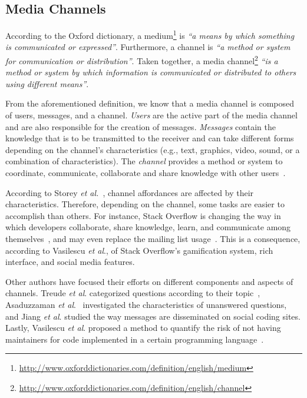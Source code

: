 \documentclass{sig-alternate-05-2015}
\begin{document}
\subsection{Media Channels}

	According to the Oxford dictionary, a medium\footnote{\url{http://www.oxforddictionaries.com/definition/english/medium}} is \textit{``a means by which something is communicated or expressed''}. 
	Furthermore, a channel is \textit{``a method or system for communication or distribution''}.
	Taken together, a media channel\footnote{\url{http://www.oxforddictionaries.com/definition/english/channel}} \textit{``is a method or system by which information is communicated or distributed to others using different means''}.

	From the aforementioned definition, we know that a media channel is composed of users, messages, and a channel. 
	\textit{Users} are the active part of the media channel and are also responsible for the creation of messages. 
	\textit{Messages} contain the knowledge that is to be transmitted to the receiver and can take different forms depending on the channel's characteristics (e.g., text, graphics, video, sound, or a combination of characteristics).
	The \textit{channel} provides a method or system to coordinate, communicate, collaborate and share knowledge with other users~\cite{Storey2014}.

	According to Storey \textit{et al.}~\cite{Storey2014}, channel affordances are affected by their characteristics.
	Therefore, depending on the channel, some tasks are easier to accomplish than others.
	For instance, Stack Overflow is changing the way in which developers collaborate, share knowledge, learn, and communicate among themselves~\cite{Storey2014}, and may even replace the mailing list usage~\cite{Vasilescu2014b}.
	This is a consequence, according to Vasilescu \textit{et al}., of Stack Overflow's gamification system, rich interface, and social media features.

	Other authors have focused their efforts on different components and aspects of channels.
	Treude \textit{et al}. categorized questions according to their topic~\cite{Treude2011}, 
	Asaduzzaman \textit{et al}.~\cite{Asaduzzaman2013} investigated the characteristics of unanswered questions,
	and Jiang \textit{et al}. studied the way messages are disseminated on social coding sites. 
	Lastly, Vasilescu \textit{et al}. proposed a method to quantify the risk of not having maintainers for code implemented in a certain programming language~\cite{Vasilescu2013b}.
\end{document}
